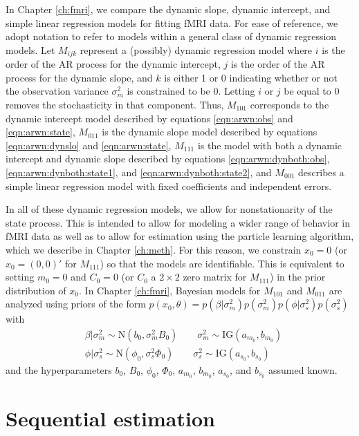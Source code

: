 In Chapter \ref{ch:fmri}, we compare the dynamic slope, dynamic intercept, and simple linear regression models for fitting fMRI data. For ease of reference, we adopt notation to refer to models within a general class of dynamic regression models. Let $M_{ijk}$ represent a (possibly) dynamic regression model where $i$ is the order of the AR process for the dynamic intercept, $j$ is the order of the AR process for the dynamic slope, and $k$ is either 1 or 0 indicating whether or not the observation variance $\sigma^2_m$ is constrained to be 0. Letting $i$ or $j$ be equal to 0 removes the stochasticity in that component. Thus, $M_{101}$ corresponds to the dynamic intercept model described by equations \ref{eqn:arwn:obs} and \ref{eqn:arwn:state}, $M_{011}$ is the dynamic slope model described by equations \ref{eqn:arwn:dynslo} and \ref{eqn:arwn:state}, $M_{111}$ is the model with both a dynamic intercept and dynamic slope described by equations \ref{eqn:arwn:dynboth:obs}, \ref{eqn:arwn:dynboth:state1}, and \ref{eqn:arwn:dynboth:state2}, and $M_{001}$ describes a simple linear regression model with fixed coefficients and independent errors.

In all of these dynamic regression models, we allow for nonstationarity of the state process. This is intended to allow for modeling a wider range of behavior in fMRI data as well as to allow for estimation using the particle learning algorithm, which we describe in Chapter \ref{ch:meth}. For this reason, we constrain $x_0 = 0$ (or $x_0 = (0,0)'$ for $M_{111}$) so that the models are identifiable. This is equivalent to setting $m_0 = 0$ and $C_0 = 0$ (or $C_0$ a $2 \times 2$ zero matrix for $M_{111}$) in the prior distribution of $x_0$. In Chapter \ref{ch:fmri}, Bayesian models for $M_{101}$ and $M_{011}$ are analyzed using priors of the form $p(x_0, \theta) = p(\beta|\sigma^2_m)p(\sigma^2_m)p(\phi|\sigma^2_s)p(\sigma^2_s)$ with
\begin{align}
&\beta|\sigma^2_m \sim \mbox{N}(b_0, \sigma^2_mB_0) \qquad \sigma^2_m \sim \mbox{IG}(a_{m_0}, b_{m_0}) \label{eqn:dynreg:prior1} \\
&\phi|\sigma^2_s \sim \mbox{N}(\phi_0, \sigma^2_s\Phi_0) \qquad \sigma^2_s \sim \mbox{IG}(a_{s_0}, b_{s_0}) \label{eqn:dynreg:prior2}
\end{align}
and the hyperparameters $b_0$, $B_0$, $\phi_0$, $\Phi_0$, $a_{m_0}$, $b_{m_0}$, $a_{s_0}$, and $b_{s_0}$ assumed known.

\section{Sequential estimation \label{sec:sequential}}

